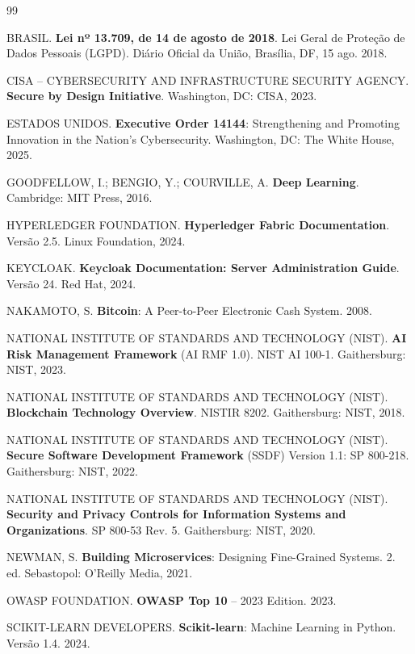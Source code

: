 \documentclass[12pt,a4paper]{article}
\begin{document}
\begin{thebibliography}{99}

BRASIL. \textbf{Lei nº 13.709, de 14 de agosto de 2018}. Lei Geral de Proteção de Dados Pessoais (LGPD). Diário Oficial da União, Brasília, DF, 15 ago. 2018.

CISA -- CYBERSECURITY AND INFRASTRUCTURE SECURITY AGENCY. \textbf{Secure by Design Initiative}. Washington, DC: CISA, 2023.

ESTADOS UNIDOS. \textbf{Executive Order 14144}: Strengthening and Promoting Innovation in the Nation's Cybersecurity. Washington, DC: The White House, 2025.

GOODFELLOW, I.; BENGIO, Y.; COURVILLE, A. \textbf{Deep Learning}. Cambridge: MIT Press, 2016.

HYPERLEDGER FOUNDATION. \textbf{Hyperledger Fabric Documentation}. Versão 2.5. Linux Foundation, 2024.

KEYCLOAK. \textbf{Keycloak Documentation: Server Administration Guide}. Versão 24. Red Hat, 2024.

NAKAMOTO, S. \textbf{Bitcoin}: A Peer-to-Peer Electronic Cash System. 2008.

NATIONAL INSTITUTE OF STANDARDS AND TECHNOLOGY (NIST). \textbf{AI Risk Management Framework} (AI RMF 1.0). NIST AI 100-1. Gaithersburg: NIST, 2023.

NATIONAL INSTITUTE OF STANDARDS AND TECHNOLOGY (NIST). \textbf{Blockchain Technology Overview}. NISTIR 8202. Gaithersburg: NIST, 2018.

NATIONAL INSTITUTE OF STANDARDS AND TECHNOLOGY (NIST). \textbf{Secure Software Development Framework} (SSDF) Version 1.1: SP 800-218. Gaithersburg: NIST, 2022.

NATIONAL INSTITUTE OF STANDARDS AND TECHNOLOGY (NIST). \textbf{Security and Privacy Controls for Information Systems and Organizations}. SP 800-53 Rev. 5. Gaithersburg: NIST, 2020.

NEWMAN, S. \textbf{Building Microservices}: Designing Fine-Grained Systems. 2. ed. Sebastopol: O'Reilly Media, 2021.

OWASP FOUNDATION. \textbf{OWASP Top 10} -- 2023 Edition. 2023.

SCIKIT-LEARN DEVELOPERS. \textbf{Scikit-learn}: Machine Learning in Python. Versão 1.4. 2024.

\end{thebibliography}
\end{document}
